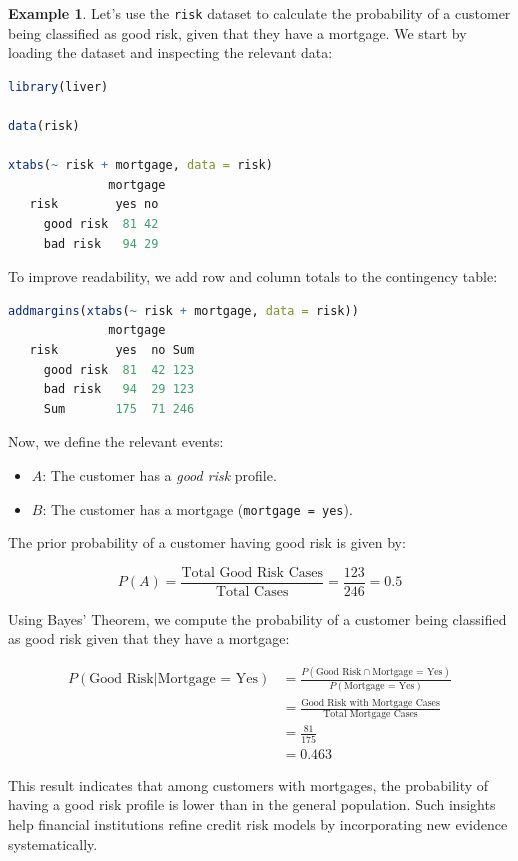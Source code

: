 \documentclass[
  11pt,
]{book}
\newcommand{\passthrough}[1]{#1}
\providecommand{\tightlist}{%
  \setlength{\itemsep}{0pt}\setlength{\parskip}{0pt}}
\theoremstyle{definition}
\theoremstyle{definition}
\newtheorem{example}{Example}[chapter]
\theoremstyle{definition}
\theoremstyle{definition}
\theoremstyle{remark}
\begin{document}
\begin{example}
\protect\hypertarget{exm:ex-bayes-risk}{}\label{exm:ex-bayes-risk}Let's use the \passthrough{\lstinline!risk!} dataset to calculate the probability of a customer being classified as good risk, given that they have a mortgage. We start by loading the dataset and inspecting the relevant data:

\begin{lstlisting}[language=R]
library(liver)         

data(risk)

xtabs(~ risk + mortgage, data = risk)
              mortgage
   risk        yes no
     good risk  81 42
     bad risk   94 29
\end{lstlisting}

To improve readability, we add row and column totals to the contingency table:

\begin{lstlisting}[language=R]
addmargins(xtabs(~ risk + mortgage, data = risk))
              mortgage
   risk        yes  no Sum
     good risk  81  42 123
     bad risk   94  29 123
     Sum       175  71 246
\end{lstlisting}

Now, we define the relevant events:

\begin{itemize}
\tightlist
\item
  \(A\): The customer has a \emph{good risk} profile.\\
\item
  \(B\): The customer has a mortgage (\passthrough{\lstinline!mortgage = yes!}).
\end{itemize}

The prior probability of a customer having good risk is given by:

\[
P(A) = \frac{\text{Total Good Risk Cases}}{\text{Total Cases}} = \frac{123}{246} = 0.5
\]

Using Bayes' Theorem, we compute the probability of a customer being classified as good risk given that they have a mortgage:

\begin{equation} 
\label{eq1}
\begin{split}
P(\text{Good Risk} | \text{Mortgage = Yes}) & = \frac{P(\text{Good Risk} \cap \text{Mortgage = Yes})}{P(\text{Mortgage = Yes})} \\
 & = \frac{\text{Good Risk with Mortgage Cases}}{\text{Total Mortgage Cases}} \\
 & = \frac{81}{175} \\
 & = 0.463
\end{split}
\end{equation}

This result indicates that among customers with mortgages, the probability of having a good risk profile is lower than in the general population. Such insights help financial institutions refine credit risk models by incorporating new evidence systematically.
\end{example}
\end{document}
